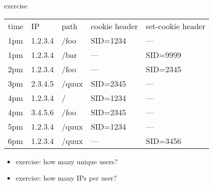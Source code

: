 \begin{frame}{exercise}
\fontsize{11}{12}\selectfont
\begin{tabular}{lllll}
time & IP & path & cookie header & set-cookie header \\
1pm & 1.2.3.4 & /foo & SID=1234 & --- \\
1pm & 1.2.3.4 & /bar & --- & SID=9999 \\
2pm & 1.2.3.4 & /foo & --- & SID=2345 \\
3pm & 2.3.4.5 & /quux & SID=2345 & --- \\
4pm & 1.2.3.4  & /& SID=1234& --- \\
4pm & 3.4.5.6 & /foo & SID=2345 & --- \\
5pm & 1.2.3.4  & /quux & SID=1234& --- \\
6pm & 1.2.3.4  & /quux & --- & SID=3456 \\
\end{tabular}
\begin{itemize}
\item exercise: how many unique users?
\item exercise: how many IPs per user?
\end{itemize}
\end{frame}
